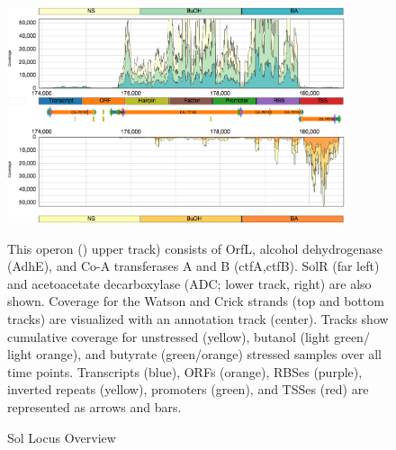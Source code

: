 \begin{figure}
\small
{\includegraphics[width=\textwidth,height=2.5in]{images/Assembly/Examples/Sol/Sol-locus-curated.png}
\label{fig:1a}}
\caption{Sol Locus Overview} This operon () upper track) consists of OrfL, alcohol dehydrogenase (AdhE), and Co-A transferases A and B (ctfA,ctfB). SolR (far left) and acetoacetate decarboxylase (ADC;  lower track, right) are also shown. Coverage for the Watson and Crick strands (top and bottom tracks) are visualized with an annotation track (center). Tracks show cumulative coverage for unstressed (yellow), butanol (light green/ light orange), and butyrate (green/orange) stressed samples over all time points. Transcripts (blue), ORFs (orange), RBSes (purple), inverted repeats (yellow), promoters (green), and TSSes (red) are represented as arrows and bars.
\end{figure}

